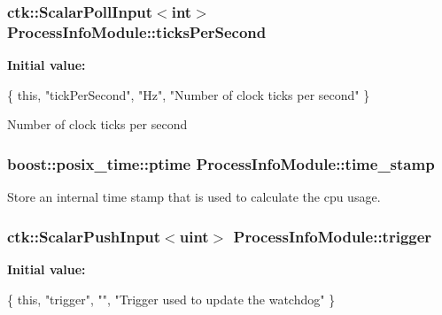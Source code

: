 \subsubsection[{\texorpdfstring{ticks\+Per\+Second}{ticksPerSecond}}]{\setlength{\rightskip}{0pt plus 5cm}ctk\+::\+Scalar\+Poll\+Input$<$int$>$ Process\+Info\+Module\+::ticks\+Per\+Second}\hypertarget{structProcessInfoModule_adf12150c732bc07aed50684eb8a90fd7}{}\label{structProcessInfoModule_adf12150c732bc07aed50684eb8a90fd7}
{\bfseries Initial value\+:}
\begin{DoxyCode}
\{ \textcolor{keyword}{this}, \textcolor{stringliteral}{"tickPerSecond"}, \textcolor{stringliteral}{"Hz"},
      \textcolor{stringliteral}{"Number of clock ticks per second"} \}
\end{DoxyCode}
Number of clock ticks per second 
\subsubsection[{\texorpdfstring{time\+\_\+stamp}{time_stamp}}]{\setlength{\rightskip}{0pt plus 5cm}boost\+::posix\+\_\+time\+::ptime Process\+Info\+Module\+::time\+\_\+stamp}\hypertarget{structProcessInfoModule_af863af6e454aa703037963ad401cae92}{}\label{structProcessInfoModule_af863af6e454aa703037963ad401cae92}
Store an internal time stamp that is used to calculate the cpu usage. 
\subsubsection[{\texorpdfstring{trigger}{trigger}}]{\setlength{\rightskip}{0pt plus 5cm}ctk\+::\+Scalar\+Push\+Input$<$uint$>$ Process\+Info\+Module\+::trigger}\hypertarget{structProcessInfoModule_acf28d33383b9399aa7f38d4502ec5cc6}{}\label{structProcessInfoModule_acf28d33383b9399aa7f38d4502ec5cc6}
{\bfseries Initial value\+:}
\begin{DoxyCode}
\{ \textcolor{keyword}{this}, \textcolor{stringliteral}{"trigger"}, \textcolor{stringliteral}{""},
      \textcolor{stringliteral}{"Trigger used to update the watchdog"} \}
\end{DoxyCode}
